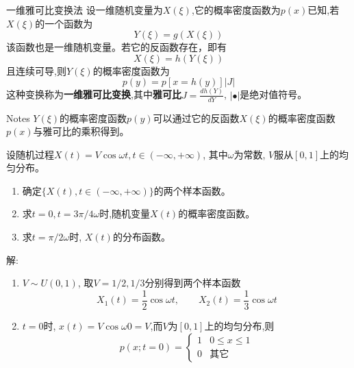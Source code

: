 \begin{frame}{一维雅可比变换法}
设一维随机变量为$X(\xi)$,它的概率密度函数为$p(x)$已知,若$X(\xi)$的一个函数为
\[Y(\xi)=g(X(\xi)) \]
该函数也是一维随机变量。若它的反函数存在，即有
\[X(\xi)=h(Y(\xi)) \]
且连续可导,则$Y(\xi)$的概率密度函数为
\[p(y)=p[x=h(y)]|J| \]
这种变换称为\textbf{一维雅可比变换},其中\textbf{雅可比}$J=\frac{dh(Y)}{dY}$, $|\bullet|$是绝对值符号。
\begin{block}{Notes}
	$Y(\xi)$的概率密度函数$p(y)$可以通过它的反函数$X(\xi)$的概率密度函数$p(x)$与雅可比的乘积得到。
\end{block}
\end{frame}

\begin{frame}
\begin{example}
	设随机过程$X(t)=V\cos\omega t,t\in(-\infty,+\infty)$, 其中$\omega$为常数, $V$服从$[0,1]$上的均匀分布。
	\begin{enumerate}
		\item 确定$\{X(t),t\in(-\infty,+\infty)\}$的两个样本函数。
		\item 求$t=0,t=3\pi/4\omega$时,随机变量$X(t)$的概率密度函数。
		\item 求$t=\pi/2\omega$时, $X(t)$的分布函数。
	\end{enumerate}
\end{example}
\end{frame}

\begin{frame}
解:
\begin{enumerate}
	\item $V\sim U(0,1)$, 取$V=1/2,1/3$分别得到两个样本函数
	\[X_1(t)=\frac{1}{2}\cos\omega t,\qquad X_2(t)=\frac{1}{3}\cos\omega t\]
	\item $t=0$时, $x(t)=V\cos\omega 0=V$,而$V$为$[0,1]$上的均匀分布,则
	$$
	p(x;t=0)=\begin{cases}
	1 & 0\le x\le 1\\
	0 &\text{其它}	
    \end{cases}
    $$
\end{enumerate}
\end{frame}

